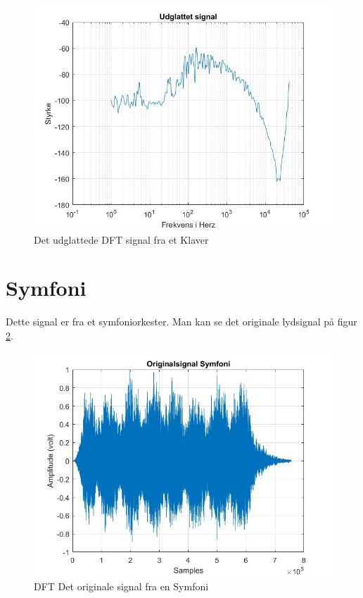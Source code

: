 \begin{figure}[H]
	\centering
	\includegraphics[width=140mm]{figures/Piano/udglattet.jpg}
	\caption{Det udglattede DFT signal fra et Klaver}
	\label{fig:Klaver udglattet}
\end{figure}
\newpage

\section{Symfoni}
Dette signal er fra et symfoniorkester. Man kan se det originale lydsignal på figur \ref{fig:Symfoni original}.
\begin{figure}[H]
	\centering
	\includegraphics[width=140mm]{figures/Symfoni/original.jpg}
	\caption{DFT Det originale signal fra en Symfoni}
	\label{fig:Symfoni original}
\end{figure}

